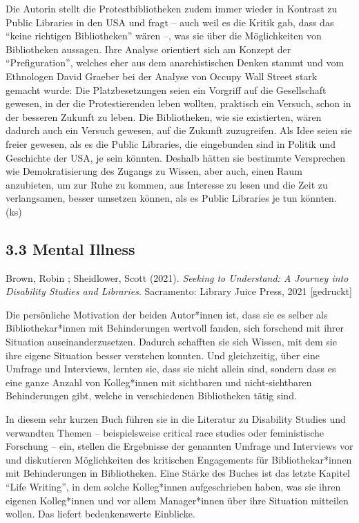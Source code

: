 \documentclass[a4paper,
fontsize=11pt,
oneside,
numbers=noperiodatend,
parskip=half-,
bibliography=totoc,
final
]{scrartcl}
\begin{document}
Die Autorin stellt die Protestbibliotheken zudem immer wieder in
Kontrast zu Public Libraries in den USA und fragt -- auch weil es die
Kritik gab, dass das \enquote{keine richtigen Bibliotheken} wären --,
was sie über die Möglichkeiten von Bibliotheken aussagen. Ihre Analyse
orientiert sich am Konzept der \enquote{Prefiguration}, welches eher aus
dem anarchistischen Denken stammt und vom Ethnologen David Graeber bei
der Analyse von Occupy Wall Street stark gemacht wurde: Die
Platzbesetzungen seien ein Vorgriff auf die Gesellschaft gewesen, in der
die Protestierenden leben wollten, praktisch ein Versuch, schon in der
besseren Zukunft zu leben. Die Bibliotheken, wie sie existierten, wären
dadurch auch ein Versuch gewesen, auf die Zukunft zuzugreifen. Als Idee
seien sie freier gewesen, als es die Public Libraries, die eingebunden
sind in Politik und Geschichte der USA, je sein könnten. Deshalb hätten
sie bestimmte Versprechen wie Demokratisierung des Zugangs zu Wissen,
aber auch, einen Raum anzubieten, um zur Ruhe zu kommen, aus Interesse
zu lesen und die Zeit zu verlangsamen, besser umsetzen können, als es
Public Libraries je tun könnten. (ks)

\hypertarget{mental-illness}{%
\subsection{3.3 Mental Illness}\label{mental-illness}}

Brown, Robin ; Sheidlower, Scott (2021). \emph{Seeking to Understand: A
Journey into Disability Studies and Libraries}. Sacramento: Library
Juice Press, 2021 {[}gedruckt{]}

Die persönliche Motivation der beiden Autor*innen ist, dass sie es
selber als Bibliothekar*innen mit Behinderungen wertvoll fanden, sich
forschend mit ihrer Situation auseinanderzusetzen. Dadurch schafften sie
sich Wissen, mit dem sie ihre eigene Situation besser verstehen konnten.
Und gleichzeitig, über eine Umfrage und Interviews, lernten sie, dass
sie nicht allein sind, sondern dass es eine ganze Anzahl von
Kolleg*innen mit sichtbaren und nicht-sichtbaren Behinderungen gibt,
welche in verschiedenen Bibliotheken tätig sind.

In diesem sehr kurzen Buch führen sie in die Literatur zu Disability
Studies und verwandten Themen -- beispielsweise critical race studies
oder feministische Forschung -- ein, stellen die Ergebnisse der
genannten Umfrage und Interviews vor und diskutieren Möglichkeiten des
kritischen Engagements für Bibliothekar*innen mit Behinderungen in
Bibliotheken. Eine Stärke des Buches ist das letzte Kapitel
\enquote{Life Writing}, in dem solche Kolleg*innen aufgeschrieben haben,
was sie ihren eigenen Kolleg*innen und vor allem Manager*innen über ihre
Situation mitteilen wollen. Das liefert bedenkenswerte Einblicke.
\end{document}
